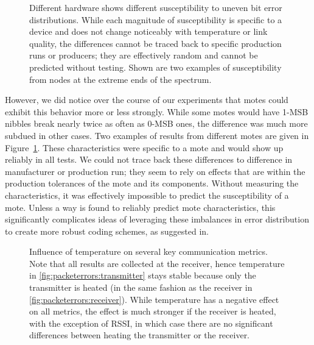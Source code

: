 \documentclass[color]{aib}
\begin{document}
\begin{figure}[tb]
\centering
{}
\hfill
{}
\vspace{-6pt}
\caption{Different hardware shows different susceptibility to uneven bit error distributions. While each magnitude of susceptibility is specific to a device and does not change noticeably with temperature or link quality, the differences cannot be traced back to specific production runs or producers; they are effectively random and cannot be predicted without testing. Shown are two examples of susceptibility from nodes at the extreme ends of the spectrum.}
\label{fig:biterrormagnitude}
\vspace{-6pt}
\end{figure}

However, we did notice over the course of our experiments that motes could exhibit this behavior more or less strongly.
While some motes would have 1-MSB nibbles break nearly twice as often as 0-MSB ones, the difference was much more subdued in other cases.
Two examples of results from different motes are given in Figure~\ref{fig:biterrormagnitude}.
These characteristics were specific to a mote and would show up reliably in all tests.
We could not trace back these differences to difference in manufacturer or production run; they seem to rely on effects that are within the production tolerances of the mote and its components.
Without measuring the characteristics, it was effectively impossible to predict the susceptibility of a mote.
Unless a way is found to reliably predict mote characteristics, this significantly complicates ideas of leveraging these imbalances in error distribution to create more robust coding schemes, as suggested in\cite{senserr}.


\begin{figure}
\centering
{}
\hfill
{}
\caption{Influence of temperature on several key communication metrics. Note that all results are collected at the receiver, hence temperature in \ref{fig:packeterrors:transmitter} stays stable because only the transmitter is heated (in the same fashion as the receiver in \ref{fig:packeterrors:receiver}). While temperature has a negative effect on all metrics, the effect is much stronger if the receiver is heated, with the exception of RSSI, in which case there are no significant differences between heating the transmitter or the receiver.}
\label{fig:packeterrors}
\end{figure} 
\end{document}
